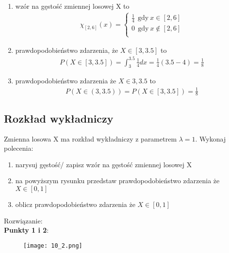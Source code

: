 \documentclass[main.tex]{subfiles}
\begin{document}
    \begin{enumerate}
        \item wzór na gęstość zmiennej losowej X to
        \begin{align*}
            \chi_{[2,6]}(x) = \left\{\begin{matrix}
                                         \frac{1}{4} ~~ \text{gdy} ~ x \in [2,6]  \\
                                         0 ~~ \text{gdy} ~ x \notin [2,6]  \\
            \end{matrix}\right.
        \end{align*}
        \item prawdopodobieństwo zdarzenia, że $X \in [3, 3.5]$ to
        \begin{align*}
            P(X \in [3, 3.5]) = \int_3^{3.5} \frac{1}{4} dx = \frac{1}{4} (3.5 - 4) = \frac{1}{8}
        \end{align*}
        \item prawdopodobieństwo zdarzenia że $X \in {3, 3.5}$ to
        \begin{align*}
            P(X \in (3, 3.5)) = P(X \in [3, 3.5]) = \frac{1}{8}
        \end{align*}
    \end{enumerate}

    \subsection{Rozkład wykładniczy}
    \begin{exercise}
        Zmienna losowa X ma rozkład wykładniczy z parametrem $\lambda = 1$. Wykonaj
        polecenia:
        \begin{enumerate}
            \item narysuj gęstość/ zapisz wzór na gęstość zmiennej losowej X
            \item na powyższym rysunku przedstaw prawdopodobieństwo zdarzenia że $X\in[0,1]$
            \item oblicz prawdopodobieństwo zdarzenia że $X \in [0,1]$
        \end{enumerate}
    \end{exercise}
    Rozwiązanie:\\


    \textbf{Punkty 1 i 2}:
    \begin{figure}[H]
        \texttt{[image: 10\_2.png]}
    \end{figure}
\end{document}
